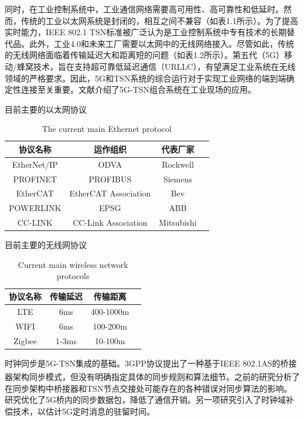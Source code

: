 \documentclass[UTF8,a4paper,12pt]{ctexart}
\numberwithin{equation}{section}
\begin{document}
同时，在工业控制系统中，工业通信网络需要高可用性、高可靠性和低延时。然而，传统的工业以太网系统是封闭的，相互之间不兼容（如表1.1所示）。为了提高实时能力，IEEE 802.1 TSN标准被广泛认为是工业控制系统中专有技术的长期替代品。此外，工业4.0和未来工厂需要以太网中的无线网络接入。尽管如此，传统的无线网络面临着传输延迟大和距离短的问题（如表1.2所示）。第五代（5G）移动/蜂窝技术，旨在支持超可靠低延迟通信（URLLC），有望满足工业系统在无线领域的严格要求。因此，5G和TSN系统的综合运行对于实现工业网络的端到端确定性连接至关重要。文献\cite{zhang2022wireless}介绍了5G-TSN组合系统在工业现场的应用。
\begin{table}[!htbp]
	\centering
	\caption{目前主要的以太网协议}
	\vspace{-10pt}
	\caption{The current main Ethernet protocol}
	
	\begin{tabular}{|c| c|c|c|}
\hline
\textbf{协议名称}& \textbf{运作组织}& \textbf{代表厂家} \\
\hline
EtherNet/IP
& ODVA
& Rockwell \\
\hline
PROFINET
& PROFIBUS
& Siemens \\
\hline
EtherCAT
& EtherCAT Association
& Bev \\
\hline
POWERLINK
& EPSG
& ABB \\
\hline
CC-LINK
& CC-Link Association
& Mitsubishi \\
\hline
	\end{tabular}
\end{table}
\begin{table}[!htbp]
	\centering
	\caption{目前主要的无线网协议}
	\vspace{-10pt}
	\caption{Current main wireless network protocols}
	\begin{tabular}{|c| c|c|c|}
\hline
\textbf{协议名称}& \textbf{传输延迟}& \textbf{传输距离} \\
\hline
LTE
& 6ms
& 400-1000m \\
\hline
WIFI
& 6ms
& 100-200m \\
\hline
Zigbee
& 1-3ms
& 10-100m \\
\hline
	\end{tabular}
\end{table}
时钟同步是5G-TSN集成的基础。3GPP协议提出了一种基于IEEE 802.1AS的桥接器架构同步模式，但没有明确指定具体的同步规则和算法细节\textsuperscript{\cite{888888}}。之前的研究\cite{9527833}分析了在同步架构中桥接器和TSN节点交接处可能存在的各种错误对同步算法的影响。研究\cite{9211936}优化了5G桥内的同步数据包，降低了通信开销。另一项研究\cite{9674640}引入了时钟域补偿技术，以估计5G定时消息的驻留时间。
\end{document}
